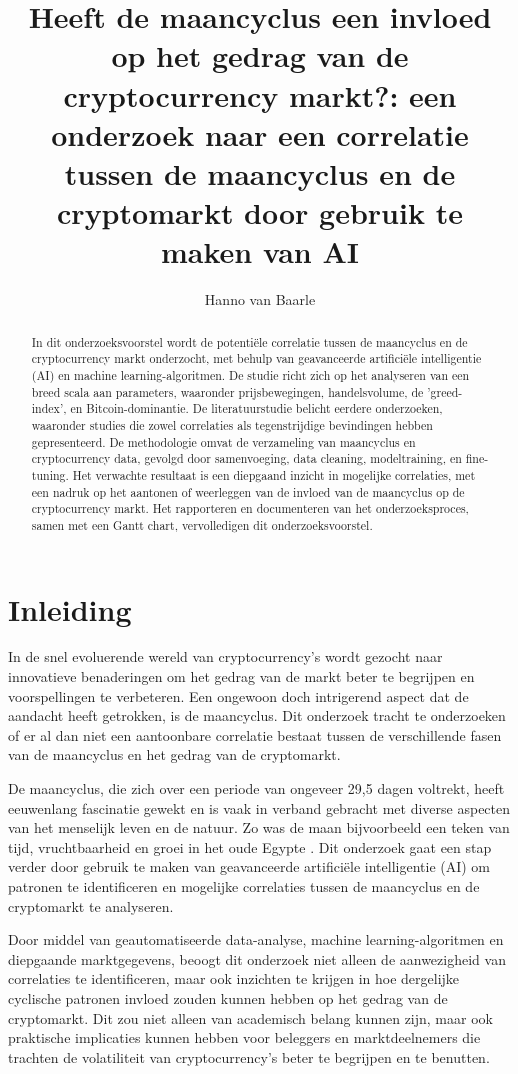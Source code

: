\documentclass{hogent-article}
\title{Heeft de maancyclus een invloed op het gedrag van de cryptocurrency markt?: een onderzoek naar een correlatie tussen de maancyclus en de cryptomarkt door gebruik te maken van AI}
\author{Hanno van Baarle}
\begin{document}
\begin{abstract}
    In dit onderzoeksvoorstel wordt de potentiële correlatie tussen de maancyclus en de cryptocurrency markt onderzocht, met behulp van geavanceerde artificiële intelligentie (AI) en machine learning-algoritmen. De studie richt zich op het analyseren van een breed scala aan parameters, waaronder prijsbewegingen, handelsvolume, de 'greed-index', en Bitcoin-dominantie. De literatuurstudie belicht eerdere onderzoeken, waaronder studies die zowel correlaties als tegenstrijdige bevindingen hebben gepresenteerd. De methodologie omvat de verzameling van maancyclus en cryptocurrency data, gevolgd door samenvoeging, data cleaning, modeltraining, en fine-tuning. Het verwachte resultaat is een diepgaand inzicht in mogelijke correlaties, met een nadruk op het aantonen of weerleggen van de invloed van de maancyclus op de cryptocurrency markt. Het rapporteren en documenteren van het onderzoeksproces, samen met een Gantt chart, vervolledigen dit onderzoeksvoorstel.
\end{abstract}

\tableofcontents

\section{Inleiding}%
\label{sec:inleiding}

In de snel evoluerende wereld van cryptocurrency's wordt gezocht naar innovatieve benaderingen om het gedrag van de markt beter te begrijpen en voorspellingen te verbeteren. Een ongewoon doch intrigerend aspect dat de aandacht heeft getrokken, is de maancyclus. Dit onderzoek tracht te onderzoeken of er al dan niet een aantoonbare correlatie bestaat tussen de verschillende fasen van de maancyclus en het gedrag van de cryptomarkt.

De maancyclus, die zich over een periode van ongeveer 29,5 dagen voltrekt, heeft eeuwenlang fascinatie gewekt en is vaak in verband gebracht met diverse aspecten van het menselijk leven en de natuur. Zo was de maan bijvoorbeeld een teken van tijd, vruchtbaarheid en groei in het oude Egypte \textbf{\cite{MoonCraterTycho2023}}. Dit onderzoek gaat een stap verder door gebruik te maken van geavanceerde artificiële intelligentie (AI) om patronen te identificeren en mogelijke correlaties tussen de maancyclus en de cryptomarkt te analyseren.

Door middel van geautomatiseerde data-analyse, machine learning-algoritmen en diepgaande marktgegevens, beoogt dit onderzoek niet alleen de aanwezigheid van correlaties te identificeren, maar ook inzichten te krijgen in hoe dergelijke cyclische patronen invloed zouden kunnen hebben op het gedrag van de cryptomarkt. Dit zou niet alleen van academisch belang kunnen zijn, maar ook praktische implicaties kunnen hebben voor beleggers en marktdeelnemers die trachten de volatiliteit van cryptocurrency's beter te begrijpen en te benutten.
\end{document}
